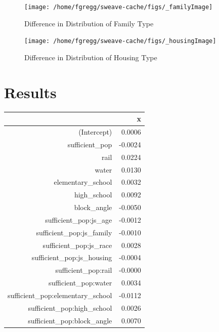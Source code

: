 \documentclass[12pt,letter]{article}\usepackage[]{graphicx}\usepackage[]{color}
\newenvironment{knitrout}{}{} %
\begin{document}
\begin{figure}
\begin{knitrout}
\color{fgcolor}

{\centering \texttt{[image: /home/fgregg/sweave-cache/figs/\_familyImage]} 

}



\end{knitrout}

\caption{Difference in Distribution of Family Type}
\end{figure}


\begin{figure}
\begin{knitrout}
\color{fgcolor}

{\centering \texttt{[image: /home/fgregg/sweave-cache/figs/\_housingImage]} 

}



\end{knitrout}

\caption{Difference in Distribution of Housing Type}
\end{figure}

\section*{Results}



\begin{table}[ht]
\centering
\begin{tabular}{rr}
  \hline
 & x \\ 
  \hline
(Intercept) & 0.0006 \\ 
  sufficient\_pop & -0.0024 \\ 
  rail & 0.0224 \\ 
  water & 0.0130 \\ 
  elementary\_school & 0.0032 \\ 
  high\_school & 0.0092 \\ 
  block\_angle & -0.0050 \\ 
  sufficient\_pop:js\_age & -0.0012 \\ 
  sufficient\_pop:js\_family & -0.0010 \\ 
  sufficient\_pop:js\_race & 0.0028 \\ 
  sufficient\_pop:js\_housing & -0.0004 \\ 
  sufficient\_pop:rail & -0.0000 \\ 
  sufficient\_pop:water & 0.0034 \\ 
  sufficient\_pop:elementary\_school & -0.0112 \\ 
  sufficient\_pop:high\_school & 0.0026 \\ 
  sufficient\_pop:block\_angle & 0.0070 \\ 
   \hline
\end{tabular}
\end{table}
\end{document}
